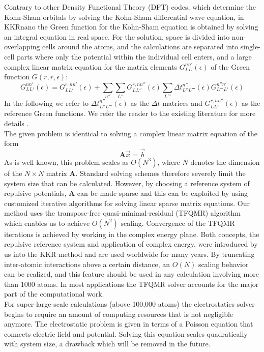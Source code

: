\documentclass [a4paper, 12pt]{article}
\newcommand{\matr}[1]{\bm{#1}}
\begin{document}
Contrary to other Density Functional Theory (DFT) codes, which determine the Kohn-Sham orbitals by solving
the Kohn-Sham differential wave equation, in KKRnano the Green function for the Kohn-Sham
equation is obtained by solving an integral equation in real space. For the solution, space is divided
into non-overlapping cells around the atoms, and the calculations are separated into single-cell parts
where only the potential within the individual cell enters, and a large complex linear matrix equation for 
the matrix elements $G_{LL}^{nn'} (\epsilon)$ of the Green function $G(r, r , \epsilon)$:
\begin{equation}
	G_{LL'}^{nn'} (\epsilon) = G_{LL'}^{r,nn'} (\epsilon) + \sum_{n''} \sum_{L''}
	G_{LL''}^{r,nn''} (\epsilon) \sum_{L'''} \Delta t_{L'' L'''}^{n''} (\epsilon)
	G_{L'''L'}^{n''n'} (\epsilon)
	\label{eq:dyson_eq}
\end{equation}
In the following we refer to $\Delta t_{L'' L'''}^{n''} (\epsilon)$ as the $\Delta t$-matrices and
$G_{LL''}^{r,nn''} (\epsilon)$ as the reference Green functions. We refer the reader to the existing
literature for more details \cite{zeller_towards_2008}.
\\
The given problem is identical to solving a complex linear matrix equation of the form
\begin{equation}
	\label{eq:axb}
	\matr{A} \vec{x} = \vec{b}
\end{equation}
As is well known, this problem scales as $O(N^3)$, where $N$ denotes the dimension of the $N \times N$
matrix $\matr{A}$. Standard solving schemes therefore severely limit the system size that can
be calculated.
However, by choosing a reference system of repulsive potentials,
$\matr{A}$ can be made sparse and this can be exploited
by using customized iterative algorithms for solving linear sparse matrix equations.
Our method uses the transpose-free quasi-minimal-residual (TFQMR) algorithm \cite{freund_qmr:_1991}
which enables us to achieve $O(N^2)$ scaling. 
Convergence of the TFQMR iterations is achieved by working in the complex energy plane. Both concepts,
the repulsive reference system and application of complex energy, were
introduced by us into the KKR method \cite{zeller_application_1982,zeller_theory_1995}
and are used worldwide for many years. 
By truncating inter-atomic interactions above a certain distance, an $O(N)$ scaling 
behavior can be realized, and this feature should be used in any calculation involving more than 1000 atoms.
In most applications the TFQMR solver accounts for the major part of the computational work.
\\
For super-large-scale calculations (above 100,000 atoms) the electrostatics solver begins
to require an amount of computing resources that is not negligible anymore. 
The electrostatic problem is given in terms of a Poisson equation that connects electric field and potential. 
Solving this equation scales quadratically with system size, a drawback which will be removed in the future. 
\end{document}
